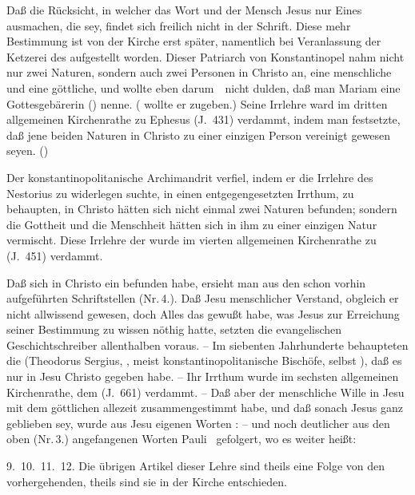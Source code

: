 \begin{aufza}
\item Daß die Rücksicht, in welcher das Wort und der Mensch Jesus nur Eines ausmachen, die  sey, findet sich freilich nicht in der Schrift. Diese mehr  Bestimmung ist von der Kirche erst später, namentlich bei Veranlassung der Ketzerei des  aufgestellt worden. Dieser Patriarch von Konstantinopel nahm nicht nur zwei Naturen, sondern auch zwei Personen in Christo an, eine menschliche und eine göttliche, und wollte eben darum~\ nicht dulden, daß man Mariam eine Gottesgebärerin () nenne. ( wollte er zugeben.) Seine Irrlehre ward im dritten allgemeinen Kirchenrathe zu Ephesus (J.~431) verdammt, indem man festsetzte, daß jene beiden Naturen in Christo zu einer einzigen Person vereinigt gewesen seyen. ()
\item Der konstantinopolitanische Archimandrit  verfiel, indem er die Irrlehre des Nestorius zu widerlegen suchte, in einen entgegengesetzten Irrthum, zu behaupten, in Christo hätten sich nicht einmal zwei Naturen befunden; sondern die Gottheit und die Menschheit hätten sich in ihm zu einer einzigen Natur vermischt. Diese Irrlehre der  wurde im vierten allgemeinen Kirchenrathe zu  (J.~451) verdammt.
\item Daß sich in Christo ein  befunden habe, ersieht man aus den schon vorhin aufgeführten Schriftstellen (Nr.\,4.). Daß Jesu menschlicher Verstand, obgleich er nicht allwissend gewesen, doch Alles das gewußt habe, was Jesus zur Erreichung seiner Bestimmung zu wissen nöthig hatte, setzten die evangelischen Geschichtschreiber allenthalben voraus. -- Im siebenten Jahrhunderte behaupteten die  (Theodorus Sergius, \uA , meist konstantinopolitanische Bischöfe, selbst ), daß es nur  in Jesu Christo gegeben habe. -- Ihr Irrthum wurde im sechsten allgemeinen Kirchenrathe, dem  (J.~661) verdammt. -- Daß aber der menschliche Wille in Jesu mit dem göttlichen allezeit zusammengestimmt habe, und daß sonach Jesus ganz  geblieben sey, wurde aus Jesu eigenen Worten :  -- und noch deutlicher aus den oben (Nr.\,3.) angefangenen Worten Pauli \ gefolgert, wo es weiter heißt: 
\item[9.\ 10.\ 11.\ 12.] Die übrigen Artikel dieser Lehre sind theils eine Folge von den vorhergehenden, theils sind sie in der Kirche  entschieden.~
\end{aufza}

